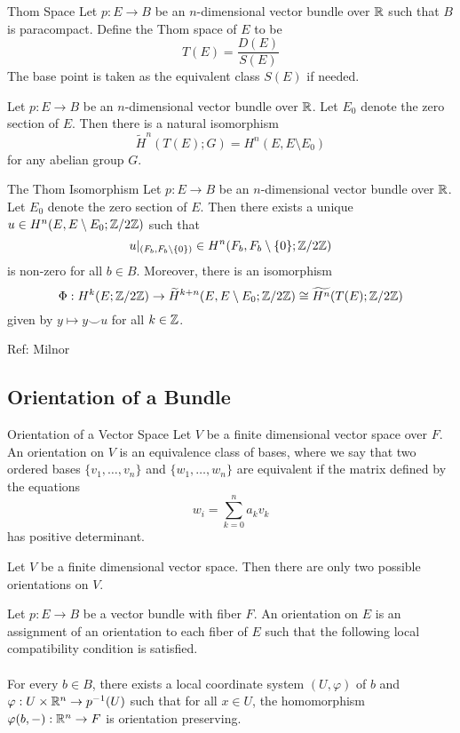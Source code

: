 \documentclass[a4paper]{article}
\begin{document}
\begin{defn}{Thom Space}{} Let $p:E\to B$ be an $n$-dimensional vector bundle over $\mathbb{R}$ such that $B$ is paracompact. Define the Thom space of $E$ to be $$T(E)=\frac{D(E)}{S(E)}$$ The base point is taken as the equivalent class $S(E)$ if needed. 
\end{defn}

\begin{lmm}{}{} Let $p:E\to B$ be an $n$-dimensional vector bundle over $\mathbb{R}$. Let $E_0$ denote the zero section of $E$. Then there is a natural isomorphism $$\widetilde{H}^n(T(E);G)=H^n(E,E\setminus E_0)$$ for any abelian group $G$. 
\end{lmm}

\begin{thm}{The Thom Isomorphism}{} Let $p:E\to B$ be an $n$-dimensional vector bundle over $\mathbb{R}$. Let $E_0$ denote the zero section of $E$. Then there exists a unique $u\in H^n(E,E\setminus E_0;\mathbb{Z}/2\mathbb{Z})$ such that $$u|_{(F_b,F_b\setminus\{0\})}\in H^n(F_b,F_b\setminus\{0\};\mathbb{Z}/2\mathbb{Z})$$ is non-zero for all $b\in B$. Moreover, there is an isomorphism $$\Phi:H^k(E;\mathbb{Z}/2\mathbb{Z})\to\widetilde{H}^{k+n}(E,E\setminus E_0;\mathbb{Z}/2\mathbb{Z})\cong\widetilde{H^n}(T(E);\mathbb{Z}/2\mathbb{Z})$$ given by $y\mapsto y\smile u$ for all $k\in\mathbb{Z}$. 
\end{thm}

Ref: Milnor

\subsection{Orientation of a Bundle}
\begin{defn}{Orientation of a Vector Space}{} Let $V$ be a finite dimensional vector space over $F$. An orientation on $V$ is an equivalence class of bases, where we say that two ordered bases $\{v_1,\dots,v_n\}$ and $\{w_1,\dots,w_n\}$ are equivalent if the matrix defined by the equations $$w_i=\sum_{k=0}^na_kv_k$$ has positive determinant. 
\end{defn}

\begin{lmm}{}{} Let $V$ be a finite dimensional vector space. Then there are only two possible orientations on $V$. 
\end{lmm}

\begin{defn}{}{} Let $p:E\to B$ be a vector bundle with fiber $F$. An orientation on $E$ is an assignment of an orientation to each fiber of $E$ such that the following local compatibility condition is satisfied. \\~\\

For every $b\in B$, there exists a local coordinate system $(U,\varphi)$ of $b$ and $\varphi:U\times\mathbb{R}^n\to p^{-1}(U)$ such that for all $x\in U$, the homomorphism $\varphi(b,-):\mathbb{R}^n\to F$ is orientation preserving. 
\end{defn}
\end{document}
